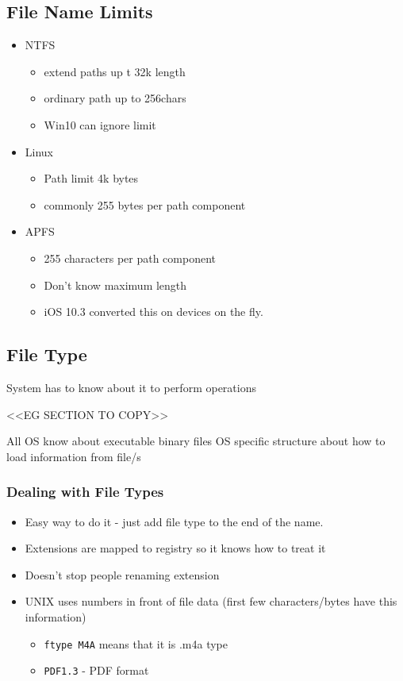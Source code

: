 \documentclass{article}
\begin{document}
	\subsection{File Name Limits}
		\begin{itemize}
			\item NTFS
			\begin{itemize}
				\item extend paths up t 32k length
				\item ordinary path up to 256chars
				\item Win10 can ignore limit
			\end{itemize}

			\item Linux
			\begin{itemize}
				\item Path limit 4k bytes
				\item commonly 255 bytes per path component
			\end{itemize}

			\item APFS
			\begin{itemize}
				\item 255 characters per path component
			\item Don't know maximum length
			\item iOS 10.3 converted this on devices on the fly.
			\end{itemize}
		\end{itemize}

	\subsection{File Type}
		System has to know about it to perform operations

		<<EG SECTION TO COPY>>

		All OS know about executable binary files
		OS specific structure about how to load information from file/s

		\subsubsection*{Dealing with File Types}
			\begin{itemize}
				\item Easy way to do it - just add file type to the end of the name.
				\item Extensions are mapped to registry so it knows how to treat it
				\item Doesn't stop people renaming extension
				\item UNIX uses numbers in front of file data (first few characters/bytes have this information)
				\begin{itemize}
					\item \texttt{ftype M4A} means that it is .m4a type
					\item \texttt{PDF1.3} - PDF format
				\end{itemize}
			\end{itemize}
\end{document}
